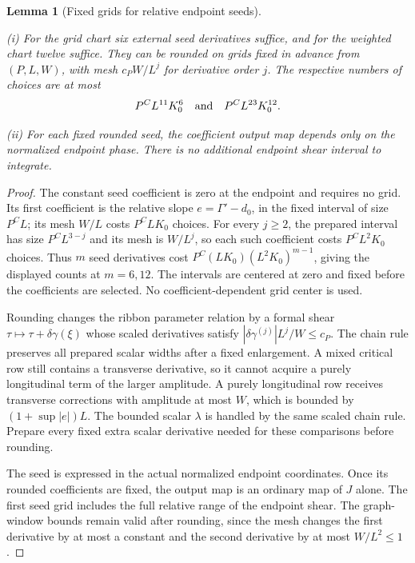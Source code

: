 \documentclass[11pt]{amsart}
\newtheorem{lemma}[theorem]{Lemma}
\theoremstyle{definition}
\theoremstyle{remark}
\numberwithin{equation}{section}
\begin{document}
\begin{lemma}[Fixed grids for relative endpoint seeds]\label{low:6:so36:seed-grids}

\noindent\textup{(i)} For the grid chart six external seed derivatives suffice, and for the weighted chart twelve suffice. They can be rounded on grids fixed in advance from $(P,L,W)$, with mesh $c_PW/L^j$ for derivative order $j$. The respective numbers of choices are at most
\[
P^C L^{11}K_0^6\quad\hbox{and}\quad P^C L^{23}K_0^{12}.
\]

\noindent\textup{(ii)} For each fixed rounded seed, the coefficient output map depends only on the normalized endpoint phase. There is no additional endpoint shear interval to integrate.
\end{lemma}
\begin{proof}
The constant seed coefficient is zero at the endpoint and requires no grid. Its first coefficient is the relative slope $e=\Gamma'-d_0$, in the fixed interval of size $P^CL$; its mesh $W/L$ costs $P^CLK_0$ choices. For every $j\ge2$, the prepared interval has size $P^CL^{3-j}$ and its mesh is $W/L^j$, so each such coefficient costs $P^CL^2K_0$ choices. Thus $m$ seed derivatives cost $P^C(LK_0)(L^2K_0)^{m-1}$, giving the displayed counts at $m=6,12$. The intervals are centered at zero and fixed before the coefficients are selected. No coefficient-dependent grid center is used.

Rounding changes the ribbon parameter relation by a formal shear $\tau\mapsto\tau+\delta\gamma(\xi)$ whose scaled derivatives satisfy $|\delta\gamma^{(j)}|L^j/W\le c_P$. The chain rule preserves all prepared scalar widths after a fixed enlargement. A mixed critical row still contains a transverse derivative, so it cannot acquire a purely longitudinal term of the larger amplitude. A purely longitudinal row receives transverse corrections with amplitude at most $W$, which is bounded by $(1+\sup|e|)L$. The bounded scalar $\lambda$ is handled by the same scaled chain rule. Prepare every fixed extra scalar derivative needed for these comparisons before rounding.

The seed is expressed in the actual normalized endpoint coordinates. Once its rounded coefficients are fixed, the output map is an ordinary map of $J$ alone. The first seed grid includes the full relative range of the endpoint shear. The graph-window bounds remain valid after rounding, since the mesh changes the first derivative by at most a constant and the second derivative by at most $W/L^2\le1$.
\end{proof}
\end{document}
